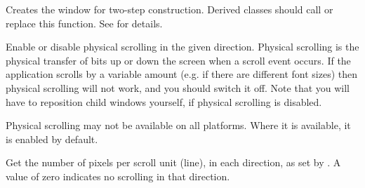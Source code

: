 \label{wxscrolledwindowcreate}


Creates the window for two-step construction. Derived classes
should call or replace this function. See \rtfsp
for details.

\label{wxscrolledwindowenablescrolling}


Enable or disable physical scrolling in the given direction. Physical
scrolling is the physical transfer of bits up or down the
screen when a scroll event occurs. If the application scrolls by a
variable amount (e.g. if there are different font sizes) then physical
scrolling will not work, and you should switch it off. Note that you
will have to reposition child windows yourself, if physical scrolling
is disabled.





Physical scrolling may not be available on all platforms. Where it is available, it is enabled
by default.

\label{wxscrolledwindowgetscrollpixelsperunit}


Get the number of pixels per scroll unit (line), in each direction, as set
by . A value of zero indicates no
scrolling in that direction.



